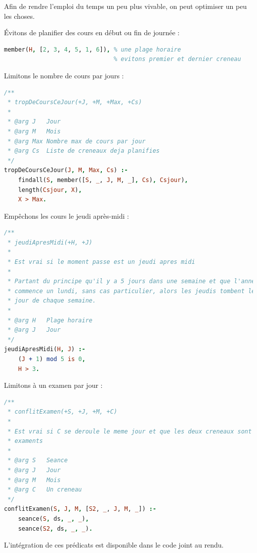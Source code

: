 Afin de rendre l'emploi du temps un peu plus vivable, on peut optimiser un peu
les choses.

Évitons de planifier des cours en début ou fin de journée :

\begin{lstlisting}[language=Prolog, caption=Éviter début et fin de journée,
captionpos=b, label={lst:debutfin}]
% plage(H, _, _).
member(H, [2, 3, 4, 5, 1, 6]), % une plage horaire
                               % evitons premier et dernier creneau
\end{lstlisting}

Limitons le nombre de cours par jours :

\begin{lstlisting}[language=Prolog, caption=Limite de cours par jour,
captionpos=b, label={lst:nbcours}]
/**
 * tropDeCoursCeJour(+J, +M, +Max, +Cs)
 *
 * @arg J   Jour
 * @arg M   Mois
 * @arg Max Nombre max de cours par jour
 * @arg Cs  Liste de creneaux deja planifies
 */
tropDeCoursCeJour(J, M, Max, Cs) :-
    findall(S, member([S, _, J, M, _], Cs), Csjour),
    length(Csjour, X),
    X > Max.
\end{lstlisting}

Empêchons les cours le jeudi après-midi :

\begin{lstlisting}[language=Prolog, caption=Jeudi après-midi,
captionpos=b, label={lst:jeudi}]
/**
 * jeudiApresMidi(+H, +J)
 *
 * Est vrai si le moment passe est un jeudi apres midi
 *
 * Partant du principe qu'il y a 5 jours dans une semaine et que l'annee
 * commence un lundi, sans cas particulier, alors les jeudis tombent le 4eme
 * jour de chaque semaine.
 *
 * @arg H   Plage horaire
 * @arg J   Jour
 */
jeudiApresMidi(H, J) :-
    (J + 1) mod 5 is 0,
    H > 3.
\end{lstlisting}

Limitons à un examen par jour :

\begin{lstlisting}[language=Prolog, caption=Détection de conflit d'exament,
captionpos=b, label={lst:examen}]
/**
 * conflitExamen(+S, +J, +M, +C)
 *
 * Est vrai si C se deroule le meme jour et que les deux creneaux sont des
 * examents
 *
 * @arg S   Seance
 * @arg J   Jour
 * @arg M   Mois
 * @arg C   Un creneau
 */
conflitExamen(S, J, M, [S2, _, J, M, _]) :-
    seance(S, ds, _, _),
    seance(S2, ds, _, _).
\end{lstlisting}

L'intégration de ces prédicats est disponible dans le code joint au rendu.

